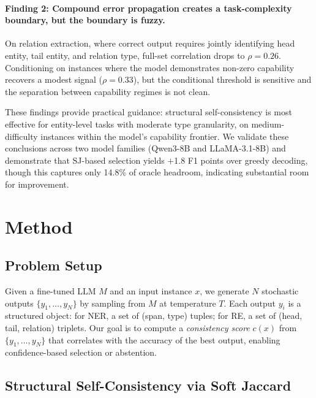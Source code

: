 \documentclass[11pt]{article}
\begin{document}
\paragraph{Finding 2: Compound error propagation creates a task-complexity boundary, but the boundary is fuzzy.}
On relation extraction, where correct output requires jointly identifying head entity, tail entity, and relation type, full-set correlation drops to $\rho{=}0.26$.
Conditioning on instances where the model demonstrates non-zero capability recovers a modest signal ($\rho{=}0.33$), but the conditional threshold is sensitive and the separation between capability regimes is not clean.

These findings provide practical guidance: structural self-consistency is most effective for entity-level tasks with moderate type granularity, on medium-difficulty instances within the model's capability frontier.
We validate these conclusions across two model families (Qwen3-8B and LLaMA-3.1-8B) and demonstrate that SJ-based selection yields $+$1.8 F1 points over greedy decoding, though this captures only 14.8\% of oracle headroom, indicating substantial room for improvement.

\section{Method}

\subsection{Problem Setup}

Given a fine-tuned LLM $M$ and an input instance $x$, we generate $N$ stochastic outputs $\{y_1, \ldots, y_N\}$ by sampling from $M$ at temperature $T$.
Each output $y_i$ is a structured object: for NER, a set of (span, type) tuples; for RE, a set of (head, tail, relation) triplets.
Our goal is to compute a \emph{consistency score} $c(x)$ from $\{y_1, \ldots, y_N\}$ that correlates with the accuracy of the best output, enabling confidence-based selection or abstention.

\subsection{Structural Self-Consistency via Soft Jaccard}
\end{document}
